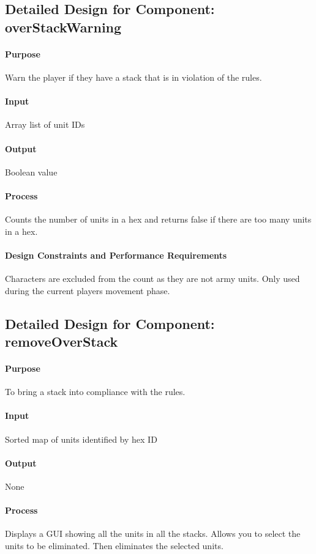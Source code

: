 \documentclass[12pt,a4paper,titlepage]{article}
\begin{document}
\subsection{Detailed Design for Component: overStackWarning}
\paragraph{Purpose} Warn the player if they have a stack that is in violation of the rules.
\paragraph{Input} Array list of unit IDs
\paragraph{Output} Boolean value
\paragraph{Process} Counts the number of units in a hex and returns false if there are too many units in a hex.
\paragraph{Design Constraints and Performance Requirements} Characters are excluded from the count as they are not army units.  Only used during the current players movement phase.

\subsection{Detailed Design for Component: removeOverStack}
\paragraph{Purpose} To bring a stack into compliance with the rules.
\paragraph{Input} Sorted map of units identified by hex ID
\paragraph{Output} None
\paragraph{Process} Displays a GUI showing all the units in all the stacks. Allows you to select the units to be eliminated. Then eliminates the selected units.
\end{document}
